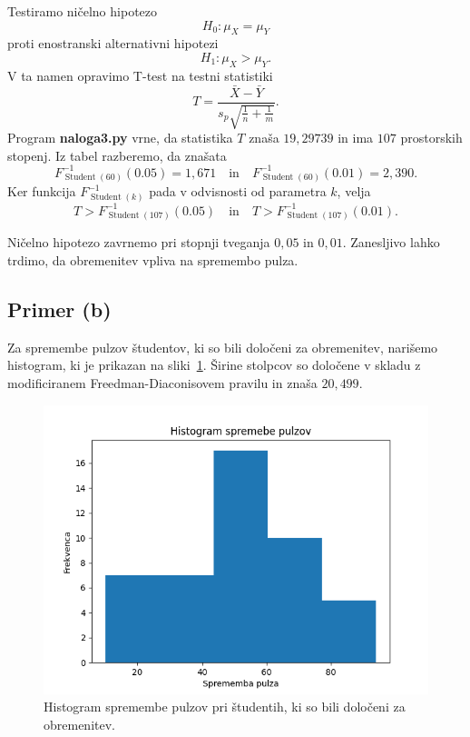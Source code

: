 \documentclass[a4paper,11pt]{article}
\DeclareMathOperator{\Student}{Student}
\begin{document}
Testiramo ničelno hipotezo
\[H_0: \mu_X = \mu_Y\]
proti enostranski alternativni hipotezi
\[H_1: \mu_X > \mu_Y.\]
V ta namen opravimo T-test na testni statistiki
\[T = \frac{\bar{X}-\bar{Y}}{s_p \sqrt{\frac{1}{n}+\frac{1}{m}}}.\]
Program \textbf{naloga3.py} vrne, da statistika $T$ znaša $19{,}29739$ in ima $107$ prostorskih stopenj.
Iz tabel razberemo, da znašata 
\[F^{-1}_{\Student(60)}(0.05) = 1{,}671 \quad \text{in} \quad F^{-1}_{\Student(60)}(0.01) = 2{,}390.\]
Ker funkcija $F^{-1}_{\Student(k)}$ pada v odvisnosti od parametra $k$, velja
\[T > F^{-1}_{\Student(107)}(0.05) \quad \text{in} \quad T > F^{-1}_{\Student(107)}(0.01).\]

Ničelno hipotezo zavrnemo pri stopnji tveganja $0{,}05$ in $0{,}01$.
Zanesljivo lahko trdimo, da obremenitev vpliva na spremembo pulza.

\subsection*{Primer (b)}

Za spremembe pulzov študentov, ki so bili določeni za obremenitev, narišemo histogram, ki je prikazan na sliki~\ref{histogram_studenti}.
Širine stolpcov so določene v skladu z modificiranem Freedman-Diaconisovem pravilu in znaša $20{,}499$.

\begin{figure}[H]
    \centering
    \includegraphics[scale=0.7]{Histogram.png}
    \caption{Histogram spremembe pulzov pri študentih, ki so bili določeni za obremenitev.}
    \label{histogram_studenti}
\end{figure}
\end{document}
